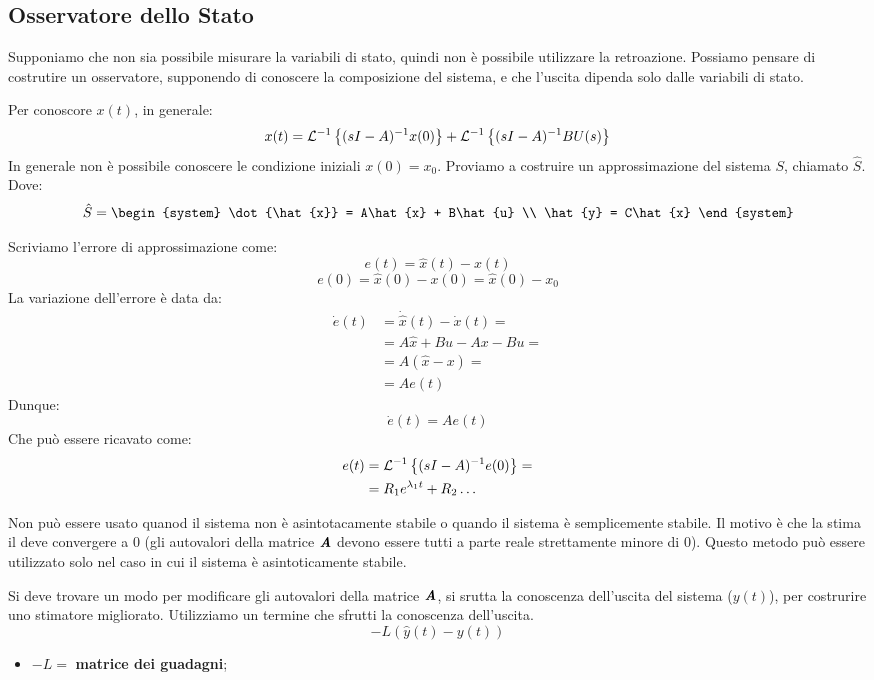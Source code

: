 \documentclass[12pt]{article}
\begin{document}
\subsection{Osservatore dello Stato}
Supponiamo che non sia possibile misurare la variabili di stato, quindi non \`e possibile utilizzare la retroazione. Possiamo pensare di costrutire un osservatore, supponendo di conoscere la composizione del sistema, e che l'uscita dipenda solo dalle variabili di stato.

Per conoscore $x(t)$, in generale:
\[ x(t) = \mathcal{L}^{-1} \left\{ (sI-A)^{-1}x(0) \right\}  + \mathcal{L}^{-1}\left\{ (sI-A)^{-1}BU(s) \right\}  \]
In generale non \`e possibile conoscere le condizione iniziali $x(0) = x_0$. Proviamo a costruire un approssimazione del sistema $S$, chiamato $\hat{S}$. Dove:
\[ \hat{S} = \begin{system} 
\dot{\hat{x}} = A\hat{x} + B\hat{u} \\ 
\hat{y} = C\hat{x}
\end{system}  \]

Scriviamo l'errore di approssimazione come:
\[ e(t) = \hat{x}(t) - x(t) \]
\[ e(0) = \hat{x}(0) - x(0) = \hat{x}(0) - x_0 \]
La variazione dell'errore \`e data da:
\begin{align*}
\dot{e}(t) & = \dot{\hat{x}}(t) - \dot{x}(t) = \\
     & = A\hat{x} + Bu - Ax - Bu = \\
     & = A(\hat{x} - x) = \\
     & = Ae(t)
\end{align*}
Dunque:
\[ \boxed{\dot{e}(t) = Ae(t) } \]
Che pu\`o essere ricavato come:
\begin{align*}
e(t) &= \mathcal{L}^{-1} \left\{ (sI-A)^{-1}e(0) \right\} = \\
     &= R_1 e^{\lambda_1t} + R_2\dots
\end{align*}

Non pu\`o essere usato quanod il sistema non \`e asintotacamente stabile o quando il sistema \`e semplicemente stabile. Il motivo \`e che la stima il deve convergere a 0 (gli autovalori della matrice $\textbf{\textit{A}}$ devono essere tutti a parte reale strettamente minore di 0). Questo metodo pu\`o essere utilizzato solo nel caso in cui il sistema \`e asintoticamente stabile.

Si deve trovare un modo per modificare gli autovalori della matrice $\textbf{\textit{A}}$, si srutta la conoscenza dell'uscita del sistema ($y(t)$), per costrurire uno stimatore migliorato. Utilizziamo un termine che sfrutti la conoscenza dell'uscita.
\[ -L(\hat{y}(t) - y(t)) \]
\begin{itemize}
    \item $-L =$ \textbf{matrice dei guadagni};
\end{itemize}
\end{document}
